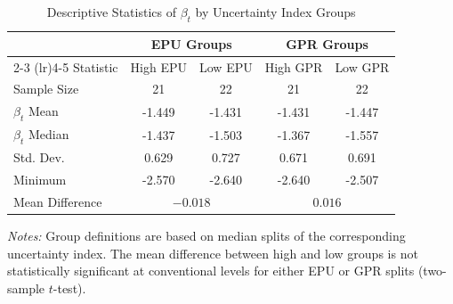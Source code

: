 \begin{table}[!htbp]
\centering
\small
\caption{Descriptive Statistics of $\beta_t$ by Uncertainty Index Groups}
\label{tab:grouped_stats}
\begin{threeparttable}
\begin{tabular}{lcccc}
\toprule
 & \multicolumn{2}{c}{EPU Groups} & \multicolumn{2}{c}{GPR Groups} \\
\cmidrule(lr){2-3} \cmidrule(lr){4-5}
Statistic & High EPU & Low EPU & High GPR & Low GPR \\
\midrule
Sample Size & 21 & 22 & 21 & 22 \\
$\beta_t$ Mean & -1.449 & -1.431 & -1.431 & -1.447 \\
$\beta_t$ Median & -1.437 & -1.503 & -1.367 & -1.557 \\
Std. Dev. & 0.629 & 0.727 & 0.671 & 0.691 \\
Minimum & -2.570 & -2.640 & -2.640 & -2.507 \\
\midrule
Mean Difference & \multicolumn{2}{c}{$-0.018$} & \multicolumn{2}{c}{$0.016$} \\
\bottomrule
\end{tabular}
\begin{tablenotes}[flushleft]
\footnotesize
\item \textit{Notes:} Group definitions are based on median splits of the corresponding uncertainty index. The mean difference between high and low groups is not statistically significant at conventional levels for either EPU or GPR splits (two-sample $t$-test).
\end{tablenotes}
\end{threeparttable}
\end{table}
